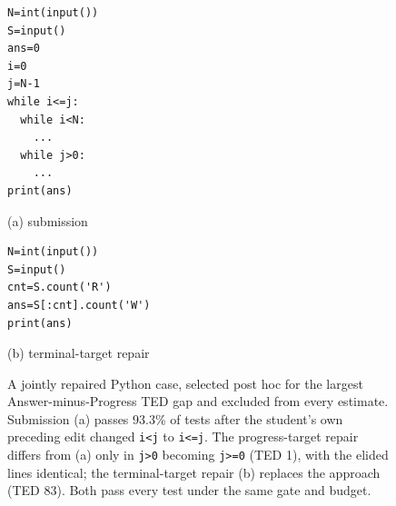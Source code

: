 \documentclass[10pt,conference]{IEEEtran}
\begin{document}
\begin{figure}[h]
\centering\scriptsize
\begin{minipage}[b]{0.52\columnwidth}
\begin{verbatim}
N=int(input())
S=input()
ans=0
i=0
j=N-1
while i<=j:
  while i<N:
    ...
  while j>0:
    ...
print(ans)
\end{verbatim}
\centering (a) submission
\end{minipage}\hfill
\begin{minipage}[b]{0.44\columnwidth}
\begin{verbatim}
N=int(input())
S=input()
cnt=S.count('R')
ans=S[:cnt].count('W')
print(ans)
\end{verbatim}
\centering (b) terminal-target repair
\end{minipage}
\caption{A jointly repaired Python case, selected post hoc for the largest Answer-minus-Progress TED gap and excluded from every estimate. Submission (a) passes 93.3\% of tests after the student's own preceding edit changed \texttt{i<j} to \texttt{i<=j}. The progress-target repair differs from (a) only in \texttt{j>0} becoming \texttt{j>=0} (TED 1), with the elided lines identical; the terminal-target repair (b) replaces the approach (TED 83). Both pass every test under the same gate and budget.}
\label{fig:case}
\end{figure}
\end{document}
